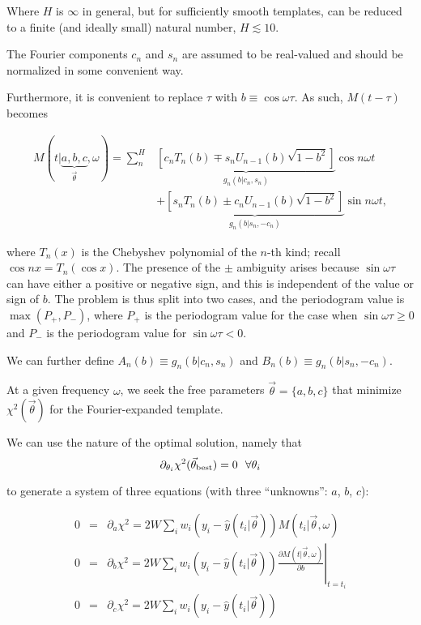 \documentclass[notitlepage]{article}
\newcommand{\somt}[1][n]{\sin{{#1}\omega t}}
\newcommand{\comt}[1][m]{\cos{{#1}\omega t}}
\begin{document}
Where $H$ is $\infty$ in general, but for sufficiently smooth templates, can be
reduced to a finite (and ideally small) natural number, $H\lesssim 10$. 

The Fourier components $c_n$ and $s_n$ are assumed to be real-valued 
and should be normalized in some convenient way.

Furthermore, it is convenient to replace $\tau$ with $b\equiv\cos\omega\tau$. As such, $M(t - \tau)$ becomes

\begin{align}
M(t|\underbrace{a, b, c}_{\vec{\theta}}, \omega) = \sum_n^H &\underbrace{\left[c_nT_n(b) \mp s_nU_{n-1}(b)\sqrt{1 - b^2}\right]}_{g_n(b|c_n, s_n)}\comt[n]\\
					&+\underbrace{\left[s_nT_n(b) \pm c_nU_{n-1}(b)\sqrt{1 - b^2}\right]}_{g_n(b|s_n, -c_n)}\somt[n],
\end{align}

where $T_n(x)$ is the Chebyshev polynomial of the $n$-th kind; recall $\cos nx = T_n(\cos x)$. The presence
of the $\pm$ ambiguity arises because $\sin\omega\tau$ can have either a positive or negative sign, and this
is independent of the value or sign of $b$. The problem is thus split into two cases, and the periodogram value
is $\max(P_+, P_-)$, where $P_+$ is the periodogram value for the case when $\sin\omega\tau \geq 0$ and $P_-$
is the periodogram value for $\sin\omega\tau < 0$.

We can further define
$A_n(b) \equiv g_n(b|c_n, s_n)$ and $B_n(b) \equiv g_n(b|s_n, -c_n)$.

At a given frequency $\omega$, we seek the free parameters $\vec{\theta} = \{a, b, c\}$ that minimize $\chi^2(\vec{\theta})$
for the Fourier-expanded template.

We can use the nature of the optimal solution, namely that 
\begin{equation}
\partial_{\theta_i}\chi^2(\vec{\theta}_{\rm best}) = 0\,\,\,\,\forall \theta_i 
\end{equation}

to generate a system of three equations (with three ``unknowns'': $a$, $b$, $c$):

\begin{eqnarray}
0 &=& \partial_{a} \chi^2 = 2W\sum_i w_i \left(y_i - \hat{y}(t_i | \vec{\theta})\right)M(t_i | \vec{\theta}, \omega)\\
0 &=& \partial_{b} \chi^2 = 2W\sum_i w_i \left(y_i - \hat{y}(t_i | \vec{\theta})\right)\left.\frac{\partial M(t | \vec{\theta}, \omega)}{\partial b} \right|_{t=t_i}\\
0 &=& \partial_{c} \chi^2 = 2W\sum_i w_i \left(y_i - \hat{y}(t_i | \vec{\theta})\right)
\end{eqnarray}
\end{document}
